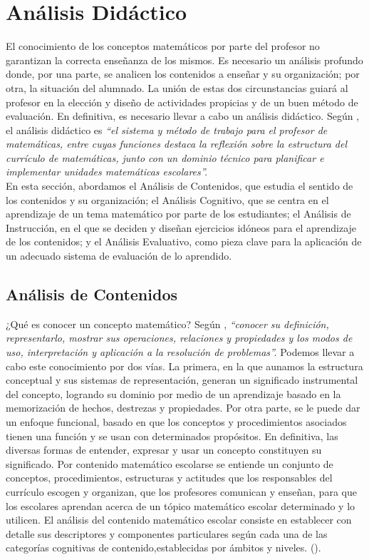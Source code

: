 \documentclass[../main.tex]{memoir}
\begin{document}
\chapter{Análisis Didáctico}
\label{sec:analisis-didactico}

El conocimiento de los conceptos matemáticos por parte del profesor no garantizan la correcta enseñanza de los mismos. Es necesario un análisis profundo donde, por una parte, se analicen los contenidos a enseñar y su organización; por otra, la situación del alumnado. La unión de estas dos circunstancias guiará al profesor en la elección y diseño de actividades propicias y de un buen método de evaluación. En definitiva, es necesario llevar  a cabo un análisis didáctico. Según \cite{rico2016}, el análisis didáctico es \textit{``el sistema y método de trabajo para el profesor de matemáticas, entre cuyas funciones destaca la reflexión sobre la estructura del currículo de matemáticas, junto con un dominio técnico para planificar e implementar unidades matemáticas escolares''.} \\

En esta sección, abordamos el Análisis de Contenidos, que estudia el sentido de los contenidos y su organización; el Análisis Cognitivo, que se centra en el aprendizaje de un tema matemático por parte de los estudiantes; el Análisis de Instrucción, en el que se deciden y diseñan ejercicios idóneos para el aprendizaje de los contenidos; y el Análisis Evaluativo, como pieza clave para la aplicación de un adecuado sistema de evaluación de lo aprendido.

\section{Análisis de Contenidos}

¿Qué es conocer un concepto matemático? Según \cite{rico2016}, \textit{``conocer su definición, representarlo, mostrar sus operaciones, relaciones y propiedades y los modos de uso, interpretación y aplicación a la resolución de problemas''.} Podemos llevar a cabo este conocimiento por dos vías. La primera, en la que aunamos la estructura conceptual y sus sistemas de representación, generan un significado instrumental del concepto, logrando su dominio por medio de un aprendizaje basado en la memorización de hechos, destrezas y propiedades. Por otra parte, se le puede dar un enfoque funcional, basado en que los conceptos y procedimientos asociados tienen una función y se usan con determinados propósitos. En definitiva, las diversas formas de entender, expresar y usar un concepto constituyen su significado. Por contenido matemático escolarse se entiende un conjunto de conceptos, procedimientos, estructuras y actitudes que los responsables del currículo escogen y organizan, que los profesores comunican y enseñan, para que los escolares aprendan acerca de un tópico matemático escolar determinado y lo utilicen. El análisis del contenido matemático escolar consiste en establecer con detalle sus descriptores y componentes particulares según cada una de las categorías cognitivas de contenido,establecidas por ámbitos y niveles. (\cite{rico2016}). \\
\end{document}

